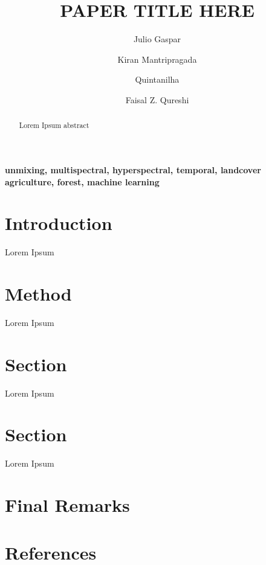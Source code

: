 \documentclass[review]{elsarticle}
\begin{document}
\begin{frontmatter}

\title{PAPER TITLE HERE}


\author[address_1, address_2]{Julio Gaspar}

\author[address_2]{Kiran Mantripragada}

\author[address_1]{Quintanilha}

\author[address_2]{Faisal Z. Qureshi}


\address[address_1]{Politechnic School of University of São Paulo, Department of Civil Engineering}
\address[address_2]{Ontario Tech University, Faculty of Sciences, Computer Vision Lab}


\begin{abstract}
    Lorem Ipsum abstract
\end{abstract}

\begin{keyword}
    \textbf{unmixing, multispectral, hyperspectral, temporal, landcover
    agriculture, forest, machine learning}
\end{keyword}

\end{frontmatter}

\linenumbers

\section{Introduction}
Lorem Ipsum


\section{Method}
Lorem Ipsum


\section{Section}
Lorem Ipsum


\section{Section}
Lorem Ipsum

\section{Final Remarks}


\nocite{*}
\section*{References}


\end{document}
